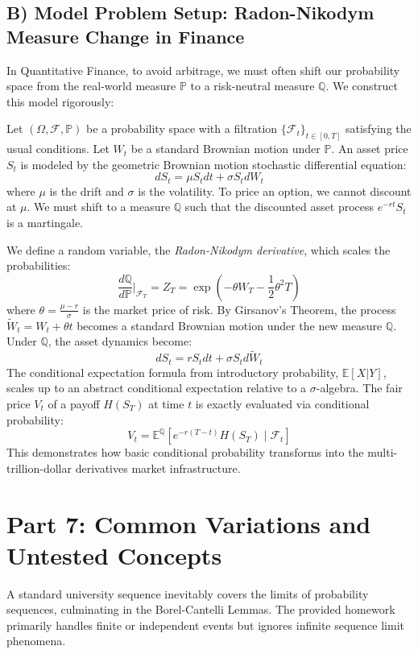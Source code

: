 \documentclass[11pt]{article}
\theoremstyle{definition}
\theoremstyle{remark}
\newcommand{\F}{\mathcal{F}}
\newcommand{\E}{\mathbb{E}}
\newcommand{\Prob}{\mathbb{P}}
\newcommand{\Q}{\mathbb{Q}}
\begin{document}
\subsection{B) Model Problem Setup: Radon-Nikodym Measure Change in Finance}
In Quantitative Finance, to avoid arbitrage, we must often shift our probability space from the real-world measure $\Prob$ to a risk-neutral measure $\Q$. We construct this model rigorously:

Let $(\Omega, \F, \Prob)$ be a probability space with a filtration $\{\F_t\}_{t \in [0,T]}$ satisfying the usual conditions. Let $W_t$ be a standard Brownian motion under $\Prob$. An asset price $S_t$ is modeled by the geometric Brownian motion stochastic differential equation:
\[ dS_t = \mu S_t dt + \sigma S_t dW_t \]
where $\mu$ is the drift and $\sigma$ is the volatility. To price an option, we cannot discount at $\mu$. We must shift to a measure $\Q$ such that the discounted asset process $e^{-rt}S_t$ is a martingale.

We define a random variable, the \textit{Radon-Nikodym derivative}, which scales the probabilities:
\[ \frac{d\Q}{d\Prob} \bigg|_{\F_T} = Z_T = \exp\left( -\theta W_T - \frac{1}{2}\theta^2 T \right) \]
where $\theta = \frac{\mu - r}{\sigma}$ is the market price of risk. By Girsanov's Theorem, the process $\tilde{W}_t = W_t + \theta t$ becomes a standard Brownian motion under the new measure $\Q$. 
Under $\Q$, the asset dynamics become:
\[ dS_t = r S_t dt + \sigma S_t d\tilde{W}_t \]
The conditional expectation formula from introductory probability, $\E[X|Y]$, scales up to an abstract conditional expectation relative to a $\sigma$-algebra. The fair price $V_t$ of a payoff $H(S_T)$ at time $t$ is exactly evaluated via conditional probability:
\[ V_t = \E^\Q \left[ e^{-r(T-t)} H(S_T) \mid \F_t \right] \]
This demonstrates how basic conditional probability transforms into the multi-trillion-dollar derivatives market infrastructure.

\newpage
\section{Part 7: Common Variations and Untested Concepts}

A standard university sequence inevitably covers the limits of probability sequences, culminating in the Borel-Cantelli Lemmas. The provided homework primarily handles finite or independent events but ignores infinite sequence limit phenomena. 
\end{document}
